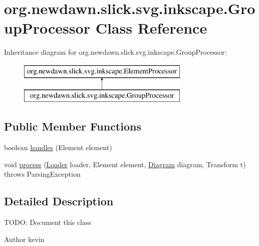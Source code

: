 \hypertarget{classorg_1_1newdawn_1_1slick_1_1svg_1_1inkscape_1_1_group_processor}{}\section{org.\+newdawn.\+slick.\+svg.\+inkscape.\+Group\+Processor Class Reference}
\label{classorg_1_1newdawn_1_1slick_1_1svg_1_1inkscape_1_1_group_processor}
Inheritance diagram for org.\+newdawn.\+slick.\+svg.\+inkscape.\+Group\+Processor\+:\begin{figure}[H]
\begin{center}
\leavevmode
\includegraphics[height=2.000000cm]{classorg_1_1newdawn_1_1slick_1_1svg_1_1inkscape_1_1_group_processor}
\end{center}
\end{figure}
\subsection*{Public Member Functions}
\begin{DoxyCompactItemize}
\item 
boolean \mbox{\hyperlink{classorg_1_1newdawn_1_1slick_1_1svg_1_1inkscape_1_1_group_processor_a870dccc7ed743d7d2456575009813c75}{handles}} (Element element)
\item 
void \mbox{\hyperlink{classorg_1_1newdawn_1_1slick_1_1svg_1_1inkscape_1_1_group_processor_af3d842954b1ee338f5dc0bbca656e9b9}{process}} (\mbox{\hyperlink{interfaceorg_1_1newdawn_1_1slick_1_1svg_1_1_loader}{Loader}} loader, Element element, \mbox{\hyperlink{classorg_1_1newdawn_1_1slick_1_1svg_1_1_diagram}{Diagram}} diagram, Transform t)  throws Parsing\+Exception 
\end{DoxyCompactItemize}


\subsection{Detailed Description}
T\+O\+DO\+: Document this class

\begin{DoxyAuthor}{Author}
kevin 
\end{DoxyAuthor}


